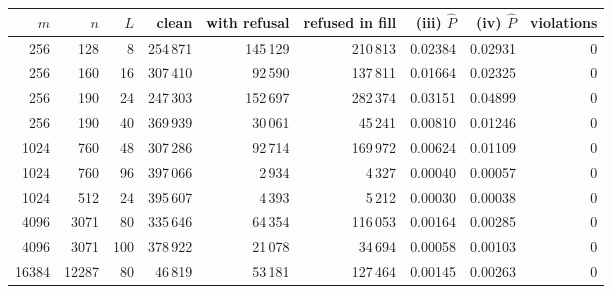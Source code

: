 \begin{tabular}{@{}rrrrrrrrr@{}}
\toprule
$m$ & $n$ & $L$ & clean & with refusal & refused in fill & (iii) $\hat P$ & (iv) $\hat P$ & violations \\
\midrule
256 & 128 & 8 & 254\,871 & 145\,129 & 210\,813 & 0.02384 & 0.02931 & 0 \\
256 & 160 & 16 & 307\,410 & 92\,590 & 137\,811 & 0.01664 & 0.02325 & 0 \\
256 & 190 & 24 & 247\,303 & 152\,697 & 282\,374 & 0.03151 & 0.04899 & 0 \\
256 & 190 & 40 & 369\,939 & 30\,061 & 45\,241 & 0.00810 & 0.01246 & 0 \\
1024 & 760 & 48 & 307\,286 & 92\,714 & 169\,972 & 0.00624 & 0.01109 & 0 \\
1024 & 760 & 96 & 397\,066 & 2\,934 & 4\,327 & 0.00040 & 0.00057 & 0 \\
1024 & 512 & 24 & 395\,607 & 4\,393 & 5\,212 & 0.00030 & 0.00038 & 0 \\
4096 & 3071 & 80 & 335\,646 & 64\,354 & 116\,053 & 0.00164 & 0.00285 & 0 \\
4096 & 3071 & 100 & 378\,922 & 21\,078 & 34\,694 & 0.00058 & 0.00103 & 0 \\
16384 & 12287 & 80 & 46\,819 & 53\,181 & 127\,464 & 0.00145 & 0.00263 & 0 \\
\bottomrule
\end{tabular}
